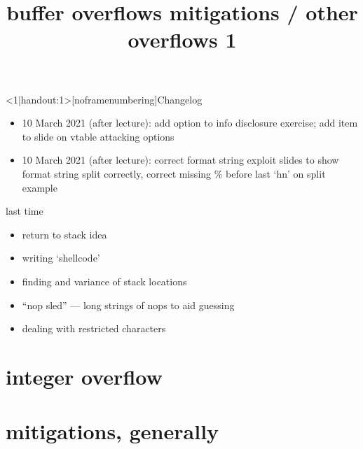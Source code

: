 \graphicspath{{./figures/}}
\title{buffer overflows  mitigations / other overflows 1}
\date{}

\begin{frame}
    \titlepage
\end{frame}

{
\begin{frame}<1|handout:1>[noframenumbering]{Changelog}
    \begin{itemize}
    \item 10 March 2021 (after lecture): add option to info disclosure exercise; add item to slide on vtable attacking options
    \item 10 March 2021 (after lecture): correct format string exploit slides to show format string split correctly, correct missing \% before last `hn' on split example
    \end{itemize}
\end{frame}
}

\begin{frame}{last time}
    \begin{itemize}
    \item return to stack idea
    \item writing `shellcode'
    \item finding and variance of stack locations
    \item ``nop sled'' --- long strings of nops to aid guessing
    \item dealing with restricted characters
    \end{itemize}
\end{frame}


\section{integer overflow}







\section{mitigations, generally}


